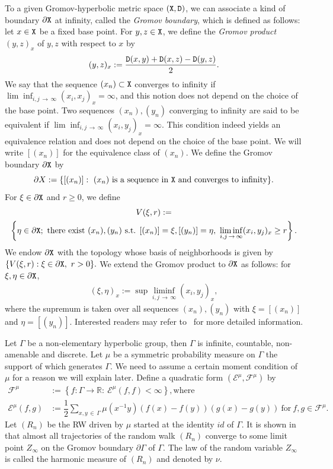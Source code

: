 \documentclass[AHL,Unicode,longabstracts,published]{cedram}
\newcommand{\ce}{\mathcal{E}}
\newcommand{\cf}{\mathcal{F}}
\newcommand{\br}{\mathbb{R}}
\begin{document}
To a given Gromov-hyperbolic metric space $(\tt{X}, \tt{D})$, we can associate a kind of boundary $\partial {\tt X}$ at infinity, called the \emph{Gromov boundary}, which is defined as follows: let $x\in\tt{X}$ be a fixed base point. For $y,z\in\tt{X}$, we define the \emph{Gromov product} $(y,z)_x$ of $y,z$ with respect to $x$ by
\begin{align}\label{def:product}
(y,z)_x:=\dfrac{{\tt D}(x,y)+{\tt D}(x,z)-{\tt D}(y,z)}{2}.
\end{align}
We say that the sequence $(x_n)\subset {\tt X}$ converges to infinity if $\lim\inf_{i,j\,\to\,\infty}(x_i,x_j)_x=\infty$, and this notion does not depend on the choice of the base point. Two sequences $(x_n), (y_n)$ converging to infinity are said to be equivalent if $\lim\inf_{i,j\,\to\,\infty}(x_i,y_j)_x=\infty$. This condition indeed yields an equivalence relation and does not depend on the choice of the base point. We will write $[(x_n)]$ for the equivalence class of $(x_n)$. We define the Gromov boundary $\partial{\tt X}$ by
\[
\partial X:=\{[(x_n)]:\ (x_n)\ \text{is a sequence in } {\tt X} \text{ and converges to infinity}\}.
\]
For $\xi\in\partial{\tt X}$ and $r\geq0$, we define
\begin{multline*}
V(\xi,r):=\\
\left\{\eta\in\partial{\tt X};\ \text{there exist }(x_n),(y_n)\text{ s.t. }[(x_n)]=\xi,[(y_n)]=\eta,\ \liminf_{i,j\,\to\,\infty}(x_i,y_j)_x\geq r\right\}.
\end{multline*}
We endow $\partial {\tt X}$ with the topology whose basis of neighborhoods is given by $\{V(\xi,r): \xi\in\partial{\tt X},\ r>0\}.$ We extend the Gromov product to $\partial {\tt X}$ as follows: for $\xi,\eta\in\partial{\tt X}$,
\begin{align}\label{def:product-boundary}
(\xi,\eta)_x:=\sup\liminf_{i,j\,\to\,\infty}(x_i,y_j)_x,
\end{align}
where the supremum is taken over all sequences $(x_n),(y_n)$ with $\xi=[(x_n)]$ and $\eta=[(y_n)]$. Interested readers may refer to~\cite{GH} for more detailed information.


Let $\Gamma$ be a non-elementary hyperbolic group, then $\Gamma$ is infinite, countable, non-amenable and discrete. Let $\mu$ be a symmetric probability measure on $\Gamma$ the support of which generates $\Gamma$. We need to assume a certain moment condition of $\mu$ for a reason we will explain later. Define a quadratic form $(\ce^{\mu},\cf^{\mu})$ by
\begin{align*}
\cf^{\mu}&:=\left\{f:\Gamma\to\br:\ \ce^{\mu}(f,f)<\infty\right\}, \text{where}\\
\ce^{\mu}(f,g)&:=\dfrac{1}{2}\sum_{x,y\,\in\,\Gamma}\mu\left(x^{-1}y\right)(f(x)-f(y))(g(x)-g(y))\ \text{for}\ f,g\in\cf^{\mu}.
\end{align*}
Let $(R_n)$ be the RW driven by $\mu$ started at the identity ${id}$ of $\Gamma$. It is shown in~\cite{Ka} that almost all trajectories of the random walk $(R_n)$ converge to some limit point $Z_\infty$ on the Gromov boundary $\partial\Gamma$ of $\Gamma$. The law of the random variable $Z_\infty$ is called the harmonic measure of $(R_n)$ and denoted by $\nu$.
\end{document}

